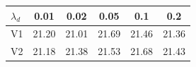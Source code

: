 \begin{tabular}{@{}lccccc@{}}
\toprule
$\lambda_d$ & 0.01 & 0.02 & 0.05 & 0.1 & 0.2 \\
\midrule
V1 & 21.20 & 21.01 & 21.69 & 21.46 & 21.36 \\
V2 & 21.18 & 21.38 & 21.53 & 21.68 & 21.43 \\
\bottomrule
\end{tabular}
